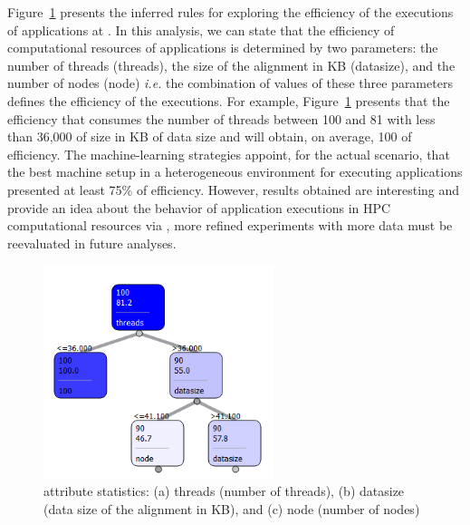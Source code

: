 Figure~\ref{fig:mldecisiontree} presents the inferred rules for exploring the efficiency of the executions of applications at \system. In this analysis, we can state that the efficiency of computational resources of \system applications is determined by two parameters: the number of threads (threads), the size of the alignment in KB (datasize), and the number of nodes (node) \textit{i.e.} the combination of values of these three parameters defines the efficiency of the executions. 
For example, Figure~\ref{fig:mldecisiontree} presents that the efficiency that consumes the number of threads between 100 and 81 with less than 36,000 of size in KB of data size and will obtain, on average, 100 of efficiency. The machine-learning strategies appoint, for the actual scenario, that the best machine setup in a heterogeneous environment for executing applications presented at least 75\% of efficiency. However, results obtained are interesting and provide an idea about the behavior of application executions in HPC computational resources via \system, more refined experiments with more data must be reevaluated in future analyses. 

\begin{figure}[!htb]
\centering
\includegraphics[width=0.6\textwidth]{imgs/mldecisiontree.png}
\vspace{-12px}
\caption{\system attribute statistics: (a) threads (number of threads), (b) datasize (data size of the alignment in KB), and (c) node (number of nodes)}
\label{fig:mldecisiontree}
\end{figure}

